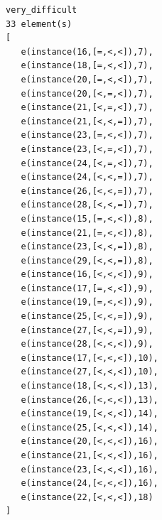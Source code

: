 \documentclass[a4paper, 12]{article}
\begin{document}
\begin{verbatim}
very_difficult
33 element(s)
[
   e(instance(16,[=,<,<]),7),
   e(instance(18,[=,<,<]),7),
   e(instance(20,[=,<,<]),7),
   e(instance(20,[<,=,<]),7),
   e(instance(21,[<,=,<]),7),
   e(instance(21,[<,<,=]),7),
   e(instance(23,[=,<,<]),7),
   e(instance(23,[<,=,<]),7),
   e(instance(24,[<,=,<]),7),
   e(instance(24,[<,<,=]),7),
   e(instance(26,[<,<,=]),7),
   e(instance(28,[<,<,=]),7),
   e(instance(15,[=,<,<]),8),
   e(instance(21,[=,<,<]),8),
   e(instance(23,[<,<,=]),8),
   e(instance(29,[<,<,=]),8),
   e(instance(16,[<,<,<]),9),
   e(instance(17,[=,<,<]),9),
   e(instance(19,[=,<,<]),9),
   e(instance(25,[<,<,=]),9),
   e(instance(27,[<,<,=]),9),
   e(instance(28,[<,<,<]),9),
   e(instance(17,[<,<,<]),10),
   e(instance(27,[<,<,<]),10),
   e(instance(18,[<,<,<]),13),
   e(instance(26,[<,<,<]),13),
   e(instance(19,[<,<,<]),14),
   e(instance(25,[<,<,<]),14),
   e(instance(20,[<,<,<]),16),
   e(instance(21,[<,<,<]),16),
   e(instance(23,[<,<,<]),16),
   e(instance(24,[<,<,<]),16),
   e(instance(22,[<,<,<]),18)
]
\end{verbatim}
\end{document}
